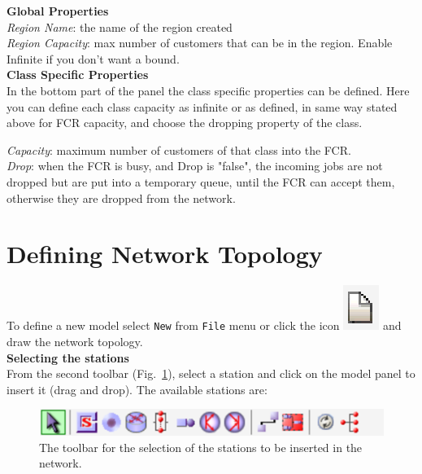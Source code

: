 \textbf{Global Properties}\\
 \emph{Region Name}: the name of the region
created\\
\emph{Region Capacity}: max number of customers that can be in the
region. Enable Infinite if you don't want a bound.\\

\textbf{Class Specific Properties}\\
 In the bottom part of the
panel the class specific properties can be defined. Here you can
define each class capacity as infinite or as defined, in same way
stated above for FCR capacity, and choose the dropping property of
the class.

\emph{Capacity}: maximum number of customers of that class into
the FCR.\\
\emph{Drop}: when the FCR is busy, and Drop is "false", the
incoming jobs are not dropped but are put into a temporary queue,
until the FCR can accept them, otherwise they are dropped from the
network.

\section{Defining Network Topology}
\label{defnettop}
To define a new model select \texttt{New} from \texttt{File} menu or
click the icon
\includegraphics[scale=.5]{img/jsimg/new.eps} and draw the
network topology.\\

\noindent \textbf{Selecting the stations}\\ From the second
toolbar (Fig.~\ref{fig:statdraw}), select a station and click on
the model panel to insert it (drag and drop). The available
stations
are:\\
\begin{figure}[h!]
    \begin{center}
        \includegraphics[scale=.5]{img/jsimg/8.4.eps}
    \end{center}
    \caption{The toolbar for the selection of the stations to be
    inserted in the network.}
    \label{fig:statdraw}
\end{figure}\\

